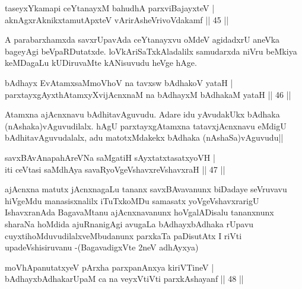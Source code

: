\begin{shl}
taseyxYkamapi ceYtanayxM bahudhA parxviBajayxteV |\\
aknAgxrAknikxtamutApxteV vArirAsheVrivoVdakamf \hfill || 45 ||
\end{shl}

\begin{artha}
A parabarxhamxda savxrUpavAda ceYtanayxvu oMdeV agidadxrU aneVka bageyAgi beVpaRDutatxde. loVkAriSaTxkAladalilx samudarxda niVru beMkiya keMDagaLu kUDiruvaMte kANisuvudu heVge hAge.
\end{artha}


\begin{shl}
bAdhayx EvA\s \s tamxsaMmoVhoV na tavxsw bAdhakoV yataH |\\
parxtayxgAyxthAtamxyXvijAcnxnaM na bAdhayxM bAdhakaM yataH \hfill || 46 ||
\end{shl}

\begin{artha}
Atamxna ajAcnxnavu bAdhitavAguvudu. Adare idu yAvudakUkx bAdhaka (nAshaka)vAguvudilalx. hAgU parxtayxgAtamxna tatavxjAcnxnavu eMdigU bAdhitavAguvudalalx, adu matotxMdakekx bAdhaka (nAshaSa)vAguvudu||
\end{artha}

\begin{shl}
savxBAvAnapahAreVNa saMgatiH sAyxtatxtasatxyoVH |\\
iti ceVtasi saMdhAya savaRyoVgeVshavxreVshavxraH \hfill || 47 ||
\end{shl}

\begin{artha}
ajAcnxna matutx jAcnxnagaLu tananx savxBAvavanunx biDadaye seVruvavu hiVgeMdu manasisxnalilx iTuTxkoMDu samasatx yoVgeVshavxrarigU IshavxranAda BagavaMtanu ajAcnxnavanunx hoVgalADisalu tananxnunx sharaNa hoMdida ajuRnanigAgi avugaLa bAdhayxbAdhaka rUpavu cuyxtihoMduvudilalxveMbudanunx parxkaTa paDisutAtx I riVti upadeVshisiruvanu -(BagavadigxVte 2neV adhAyxya)
\end{artha}

\begin{shl}
moVhApanutatxyeV pArxha parxpanAnxya kiriVTineV |\\
bAdhayxbAdhakarUpaM ca na veyxVtiVti parxkAshayanf \hfill || 48 ||
\end{shl}

